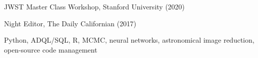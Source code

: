 \documentclass[12pt,letterpaper]{article}
\begin{document}
\begin{list}{}{\cvlist}
\item JWST Master Class Workshop, Stanford University (2020)
\item Night Editor, The Daily Californian (2017)
\end{list}

\begin{list}{}{\cvlist}
\item Python, ADQL/SQL, R, MCMC, neural networks, astronomical image reduction, open-source code management
\end{list}
\end{document}
